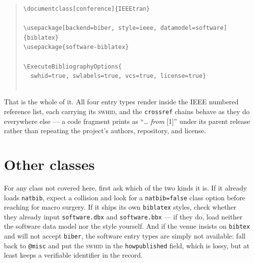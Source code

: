 \begin{quote}\footnotesize
\begin{verbatim}
\documentclass[conference]{IEEEtran}

\usepackage[backend=biber, style=ieee, datamodel=software]{biblatex}
\usepackage{software-biblatex}

\ExecuteBibliographyOptions{
  swhid=true, swlabels=true, vcs=true, license=true}


\end{verbatim}
\end{quote}

\noindent That is the whole of it. All four entry types render inside the IEEE numbered reference
list, each carrying its \textsc{swhid}, and the \texttt{crossref} chains behave as they do everywhere
else --- a code fragment prints as \enquote{\ldots{} \emph{from} [1]} under its parent release rather
than repeating the project's authors, repository, and license.

\section{Other classes}

For any class not covered here, first ask which of the two kinds it is. If it already loads
\texttt{natbib}, expect a collision and look for a \texttt{natbib=false} class option before reaching
for macro surgery. If it ships its own \texttt{biblatex} styles, check whether they already input
\texttt{software.dbx} and \texttt{software.bbx} --- if they do, load neither the software data model
nor the style yourself. And if the venue insists on \texttt{bibtex} and will not accept
\texttt{biber}, the software entry types are simply not available: fall back to \texttt{@misc} and
put the \textsc{swhid} in the \texttt{howpublished} field, which is lossy, but at least keeps a
verifiable identifier in the record.
